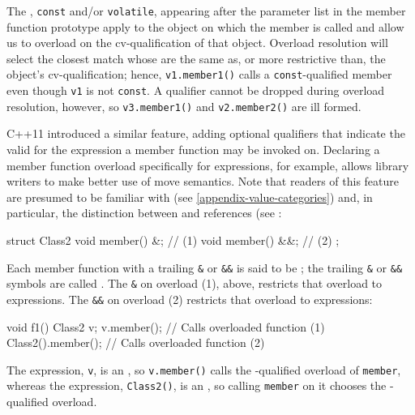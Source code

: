 \noindent The , \lstinline!const! and/or \lstinline!volatile!,
appearing after the parameter list in the member function prototype
apply to the object on which the member is called and allow us to
overload on the cv-qualification of that object. Overload resolution
will select the closest match whose  are the same
as, or more restrictive than, the object's cv-qualification; hence,
\lstinline!v1.member1()! calls a \lstinline!const!-qualified member even
though \lstinline!v1! is not \lstinline!const!. A qualifier cannot be dropped
during overload resolution, however, so \lstinline!v3.member1()! and
\lstinline!v2.member2()! are ill formed.

C++11 introduced a similar feature, adding optional qualifiers that
indicate the valid  for the expression a member
function may be invoked on. Declaring a member function overload
specifically for  expressions, for example, allows library
writers to make better use of move semantics. Note that readers of this
feature are presumed to be familiar with  (see \ref{appendix-value-categories}) and, in
particular, the distinction between  and 
references (see :

\begin{emcppslisting}
struct Class2
{
    void member() &;   // (1)
    void member() &&;  // (2)
};
\end{emcppslisting}
    

\noindent Each member function with a trailing \lstinline!&! or \lstinline!&&! is
said to be ; the trailing \lstinline!&! or
\lstinline!&&! symbols are called . The
\lstinline!&!  on overload (1), above, restricts
that overload to  expressions. The \lstinline!&&!
 on overload (2) restricts that overload to
 expressions:

\begin{emcppslisting}
void f1()
{
    Class2 v;
    v.member();         // Calls overloaded function (1)
    Class2().member();  // Calls overloaded function (2)
}
\end{emcppslisting}
    

\noindent The expression, \lstinline!v!, is an , so \lstinline!v.member()!
calls the -qualified overload of \lstinline!member!, whereas
the expression, \lstinline!Class2()!, is an , so calling
\lstinline!member! on it chooses the -qualified overload.


